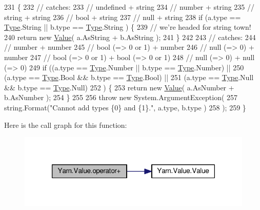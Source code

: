 \begin{DoxyCode}
231                                                          \{
232             \textcolor{comment}{// catches:}
233             \textcolor{comment}{// undefined + string}
234             \textcolor{comment}{// number + string}
235             \textcolor{comment}{// string + string}
236             \textcolor{comment}{// bool + string}
237             \textcolor{comment}{// null + string}
238             \textcolor{keywordflow}{if} (a.type == \hyperlink{a00177_ad5aaf60ee4504608fcc2ffadefa14884}{Type}.String || b.type == \hyperlink{a00177_ad5aaf60ee4504608fcc2ffadefa14884}{Type}.String ) \{
239                 \textcolor{comment}{// we're headed for string town!}
240                 \textcolor{keywordflow}{return} \textcolor{keyword}{new} \hyperlink{a00177_a7d2db75682c57463bf43c13499991ad4}{Value}( a.AsString + b.AsString );
241             \}
242 
243             \textcolor{comment}{// catches:}
244             \textcolor{comment}{// number + number}
245             \textcolor{comment}{// bool (=> 0 or 1) + number}
246             \textcolor{comment}{// null (=> 0) + number}
247             \textcolor{comment}{// bool (=> 0 or 1) + bool (=> 0 or 1)}
248             \textcolor{comment}{// null (=> 0) + null (=> 0)}
249             \textcolor{keywordflow}{if} ((a.type == \hyperlink{a00177_ad5aaf60ee4504608fcc2ffadefa14884}{Type}.Number || b.type == \hyperlink{a00177_ad5aaf60ee4504608fcc2ffadefa14884}{Type}.Number) ||
250                 (a.type == \hyperlink{a00177_ad5aaf60ee4504608fcc2ffadefa14884}{Type}.Bool && b.type == \hyperlink{a00177_ad5aaf60ee4504608fcc2ffadefa14884}{Type}.Bool) ||
251                 (a.type == \hyperlink{a00177_ad5aaf60ee4504608fcc2ffadefa14884}{Type}.Null && b.type == \hyperlink{a00177_ad5aaf60ee4504608fcc2ffadefa14884}{Type}.Null)
252             ) \{
253                 \textcolor{keywordflow}{return} \textcolor{keyword}{new} \hyperlink{a00177_a7d2db75682c57463bf43c13499991ad4}{Value}( a.AsNumber + b.AsNumber );
254             \}
255 
256             \textcolor{keywordflow}{throw} \textcolor{keyword}{new} System.ArgumentException(
257                 string.Format(\textcolor{stringliteral}{"Cannot add types \{0\} and \{1\}."}, a.type, b.type )
258             );
259         \}
\end{DoxyCode}


Here is the call graph for this function\-:
\nopagebreak
\begin{figure}[H]
\begin{center}
\leavevmode
\includegraphics[width=318pt]{a00177_abfd48481b0ac28ff5485a850a8271dfd_cgraph}
\end{center}
\end{figure}


